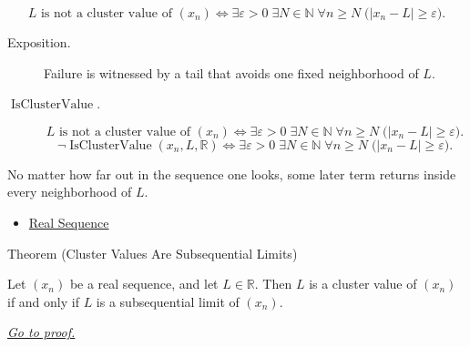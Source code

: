\begin{remark*}
\[
L\text{ is not a cluster value of }(x_n)
\Longleftrightarrow
\exists \varepsilon>0\;\exists N\in\mathbb{N}\;\forall n\ge N
\;\bigl(|x_n-L|\ge\varepsilon\bigr).
\]
\end{remark*}



\begin{remark*}
\begin{description}
  \item[Exposition.]
Failure is witnessed by a tail that avoids one fixed neighborhood of $L$.
  \item[\(\operatorname{IsClusterValue}.\)]
\[
L\text{ is not a cluster value of }(x_n)
\Longleftrightarrow
\exists \varepsilon>0\;\exists N\in\mathbb{N}\;\forall n\ge N
\;\bigl(|x_n-L|\ge\varepsilon\bigr).
\]
\[
\neg\operatorname{IsClusterValue}(x_n,L,\mathbb{R})
\Longleftrightarrow
\exists \varepsilon>0\;\exists N\in\mathbb{N}\;\forall n\ge N
\;\bigl(|x_n-L|\ge\varepsilon\bigr).
\]
\end{description}
\end{remark*}

\begin{remark*}[Interpretation]
No matter how far out in the sequence one looks, some later term returns
inside every neighborhood of $L$.
\end{remark*}

\begin{dependencies}
\begin{itemize}
  \item \hyperref[def:real-sequence]{Real Sequence}
\end{itemize}
\end{dependencies}


\begin{theorembox}{Theorem (Cluster Values Are Subsequential Limits)}
\begin{theorem}
\label{thm:cluster-values-are-subsequential-limits}
Let $(x_n)$ be a real sequence, and let $L\in\mathbb{R}$. Then $L$ is a
cluster value of $(x_n)$ if and only if $L$ is a subsequential limit of
$(x_n)$.

\smallskip
\noindent
\hyperref[prf:cluster-values-are-subsequential-limits]{\textit{Go to proof.}}
\end{theorem}
\end{theorembox}

